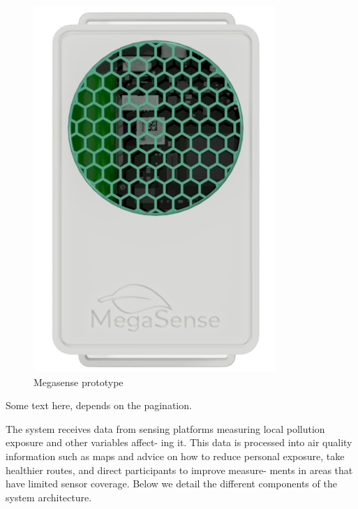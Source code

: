 		\noindent
		\begin{minipage}{0.4\textwidth}%
			\begin{figure}[H]
				\centering
				\includegraphics[width=.8\textwidth]{resources/img/megasense}
				\caption{Megasense prototype}
				\label{img:megasense_picture}
			\end{figure}
			\vspace{3mm}
		\end{minipage}%
		\hfill%
		\begin{minipage}{0.6\textwidth}\raggedright
			Some text here, depends on the pagination.
		\end{minipage}
	
		The system receives data from sensing platforms
		measuring local pollution exposure and other variables affect-
		ing it. This data is processed into air quality information such
		as maps and advice on how to reduce personal exposure, take
		healthier routes, and direct participants to improve measure-
		ments in areas that have limited sensor coverage. Below we
		detail the different components of the system architecture.

